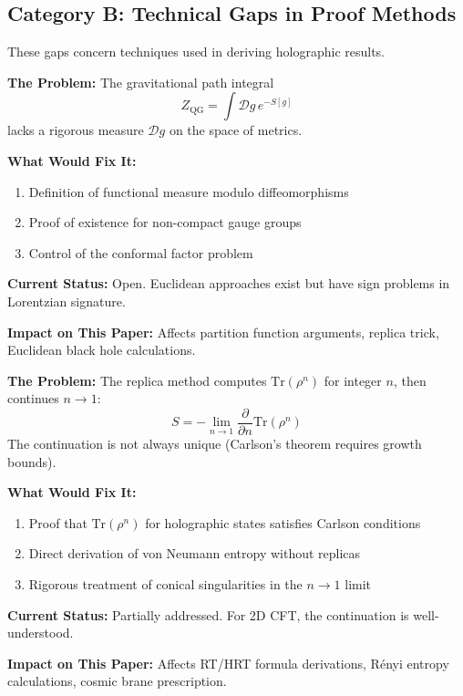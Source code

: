 \documentclass[12pt,a4paper]{article}
\begin{document}
\subsection{Category B: Technical Gaps in Proof Methods}

These gaps concern techniques used in deriving holographic results.

\begin{gapbox}[title={Gap B1: Path Integral Measure}]
\textbf{The Problem:} The gravitational path integral
\[
Z_{\text{QG}} = \int \mathcal{D}g \, e^{-S[g]}
\]
lacks a rigorous measure $\mathcal{D}g$ on the space of metrics.

\textbf{What Would Fix It:}
\begin{enumerate}
    \item Definition of functional measure modulo diffeomorphisms
    \item Proof of existence for non-compact gauge groups
    \item Control of the conformal factor problem
\end{enumerate}

\textbf{Current Status:} Open. Euclidean approaches exist but have sign problems in Lorentzian signature.

\textbf{Impact on This Paper:} Affects partition function arguments, replica trick, Euclidean black hole calculations.
\end{gapbox}

\begin{gapbox}[title={Gap B2: Replica Trick Analytic Continuation}]
\textbf{The Problem:} The replica method computes $\text{Tr}(\rho^n)$ for integer $n$, then continues $n \to 1$:
\[
S = -\lim_{n \to 1} \frac{\partial}{\partial n} \text{Tr}(\rho^n)
\]
The continuation is not always unique (Carlson's theorem requires growth bounds).

\textbf{What Would Fix It:}
\begin{enumerate}
    \item Proof that $\text{Tr}(\rho^n)$ for holographic states satisfies Carlson conditions
    \item Direct derivation of von Neumann entropy without replicas
    \item Rigorous treatment of conical singularities in the $n \to 1$ limit
\end{enumerate}

\textbf{Current Status:} Partially addressed. For 2D CFT, the continuation is well-understood.

\textbf{Impact on This Paper:} Affects RT/HRT formula derivations, R\'enyi entropy calculations, cosmic brane prescription.
\end{gapbox}
\end{document}
